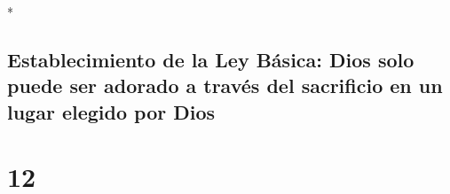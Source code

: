 \begin{paracol}{2}
\begin{otherlanguage}{english}
\end{otherlanguage}

\switchcolumn[0]*

\hypertarget{establecimiento-de-la-ley-buxe1sica-dios-solo-puede-ser-adorado-a-travuxe9s-del-sacrificio-en-un-lugar-elegido-por-dios}{%
\subsection{Establecimiento de la Ley Básica: Dios solo puede ser
adorado a través del sacrificio en un lugar elegido por
Dios}\label{establecimiento-de-la-ley-buxe1sica-dios-solo-puede-ser-adorado-a-travuxe9s-del-sacrificio-en-un-lugar-elegido-por-dios}}

\hypertarget{section-22}{%
\section{12}\label{section-22}}


\end{paracol}
